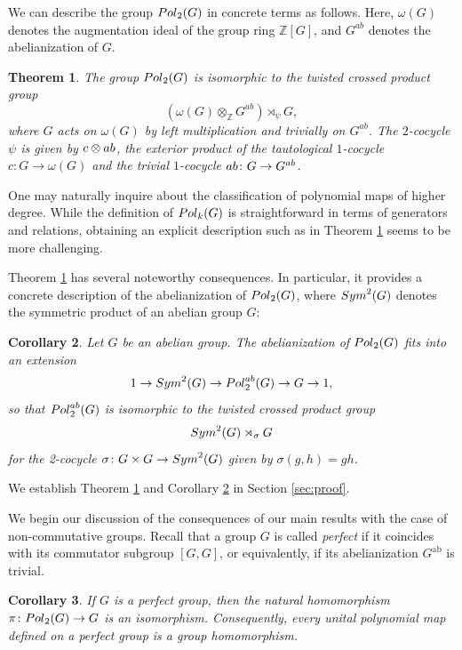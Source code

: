 \documentclass[a4paper,11pt]{amsproc}
\theoremstyle{plain}
\newtheorem{theorem}{Theorem}[section]
\newtheorem{corollary}[theorem]{Corollary}
\theoremstyle{definition}
\begin{document}
We can describe the group ${\rm Pol}_2(G)$ in concrete terms as follows. Here, $\omega(G)$ denotes the augmentation ideal of the group ring $\mathbb{Z}[G]$, and $G^{ab}$ denotes the abelianization of $G$. 

\begin{theorem} \label{thm:pol2}
The group ${\rm Pol}_2(G)$ is isomorphic to the twisted crossed product group 
\[
(\omega(G) \otimes_{\mathbb{Z}} G^{ab}) \rtimes_{\psi} G,
\]
where $G$ acts on $\omega(G)$ by left multiplication and trivially on $G^{ab}$. The $2$-cocycle $\psi$ is given by $c \otimes {\rm ab}$, the exterior product of the tautological $1$-cocycle $c \colon G \to \omega(G)$ and the trivial $1$-cocycle ${\rm ab} \colon G \to G^{ab}$.
\end{theorem}

One may naturally inquire about the classification of polynomial maps of higher degree. While the definition of ${\rm Pol}_k(G)$ is straightforward in terms of generators and relations, obtaining an explicit description such as in Theorem \ref{thm:pol2} seems to be more challenging.


Theorem \ref{thm:pol2} has several noteworthy consequences. In particular, it provides a concrete description of the abelianization of ${\rm Pol}_2(G)$, where ${\rm Sym}^2(G)$ denotes the symmetric product of an abelian group $G$: 

\begin{corollary} \label{cor:abel}
Let $G$ be an abelian group.
The abelianization of ${\rm Pol}_2(G)$ fits into an extension
$$1 \to {\rm Sym}^2(G) \to {\rm Pol}_2^{ab}(G) \to G \to 1,$$
so that ${\rm Pol}_2^{ab}(G)$ is isomorphic to the twisted crossed product group
$${\rm Sym}^2(G) \rtimes_{\sigma} G$$ for the 2-cocycle $\sigma\colon G \times G \to {\rm Sym}^2(G)$  given by $\sigma(g,h)=gh$. 
\end{corollary}

We establish Theorem \ref{thm:pol2} and Corollary \ref{cor:abel} in Section \ref{sec:proof}. 

We begin our discussion of the consequences of our main results with the case of non-commutative groups.
Recall that a group $G$ is called \emph{perfect} if it coincides with its commutator subgroup $[G, G]$, or equivalently, if its abelianization $G^{\mathrm{ab}}$ is trivial. 

\begin{corollary}\label{cor:perfect}
If $G$ is a perfect group, then the natural homomorphism $\pi \colon {\rm Pol}_2(G) \to G$ is an isomorphism. Consequently, every unital polynomial map defined on a perfect group is a group homomorphism.
\end{corollary}
\end{document}
